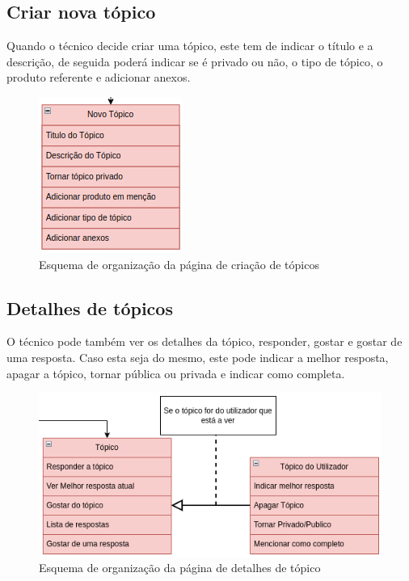 \subsection{Criar nova tópico}

Quando o técnico decide criar uma tópico, este tem de indicar o título e a descrição, de seguida poderá indicar se é privado ou não, o tipo de tópico, o produto referente e adicionar anexos.

\begin{figure}[htb]
  \centering
  
  \includegraphics[height=0.3\textwidth]{images/Arquiteturas/superficial_de_app/criar_topico.png}
  \caption{Esquema de organização da página de criação de tópicos}
  \label{fig:6}
\end{figure}

\newpage

\subsection{Detalhes de tópicos}

O técnico pode também ver os detalhes da tópico, responder, 
gostar e gostar de uma resposta.
Caso esta seja do mesmo, este pode indicar a melhor resposta, apagar a tópico, tornar pública ou privada e indicar como completa.

\begin{figure}[htb]
  \centering
  
  \includegraphics[height=0.35\textwidth]{images/Arquiteturas/superficial_de_app/detalhes_topico.png}
  \caption{Esquema de organização da página de detalhes de tópico}
  \label{fig:7}
\end{figure}

